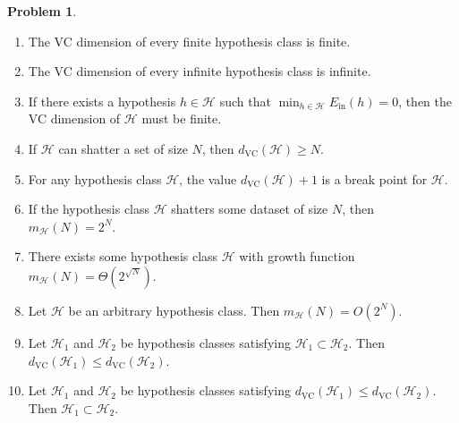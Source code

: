 \documentclass[10pt]{exam}
\theoremstyle{definition}
\newtheorem{problem}{Problem}
\newcommand{\Ein}{E_{\text{in}}}
\newcommand{\mH}{m_{\mathcal H}}
\newcommand{\dvc}{{d_{\text{VC}}}}
\begin{document}
\begin{problem}
\begin{enumerate}
        \item The VC dimension of every finite hypothesis class is finite.
            \vspace{3in}
        \item The VC dimension of every infinite hypothesis class is infinite.
            \vspace{3in}
        \item If there exists a hypothesis $h\in\mathcal H$ such that $\min_{h\in\mathcal H} \Ein(h) = 0$,
            then the VC dimension of $\mathcal H$ must be finite.
            \vspace{3in}
        \item
            If $\mathcal H$ can shatter a set of size $N$, then $\dvc(\mathcal H) \ge N$.
            \vspace{3in}
        \item
            For any hypothesis class $\mathcal H$, the value $\dvc(\mathcal H) + 1$ is a break point for $\mathcal H$.
            \vspace{3in}
        \item
            If the hypothesis class $\mathcal H$ shatters some dataset of size $N$, then $\mH(N) = 2^N$.
            \vspace{3in}
        \item
            There exists some hypothesis class $\mathcal H$ with growth function $\mH(N) = \Theta(2^{\sqrt{N}})$.
            \vspace{3in}
        \item
            Let $\mathcal H$ be an arbitrary hypothesis class.
            Then $\mH(N) = O(2^N)$.
            \vspace{3in}
        \item
            Let $\mathcal H_1$ and $\mathcal H_2$ be hypothesis classes satisfying $\mathcal H_1 \subset \mathcal H_2$.
            Then $\dvc(\mathcal H_1) \le \dvc(\mathcal H_2)$.
            \vspace{3in}
        \item
            Let $\mathcal H_1$ and $\mathcal H_2$ be hypothesis classes satisfying $\dvc(\mathcal H_1) \le \dvc(\mathcal H_2)$.
            Then $\mathcal H_1 \subset \mathcal H_2$.
            \vspace{3in}

\end{enumerate}
\end{problem}
\end{document}
